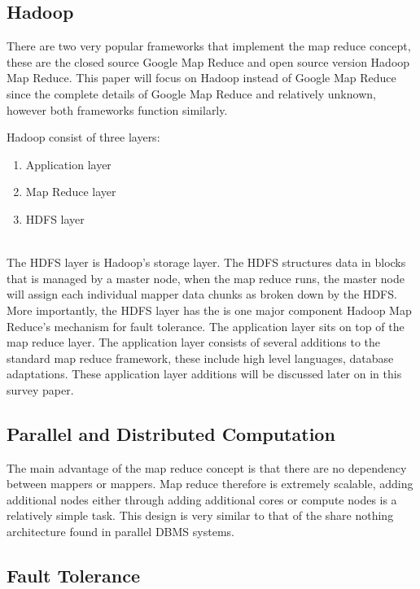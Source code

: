 \documentclass[10pt,twocolumn]{IEEEtran11}
\begin{document}
\subsection{Hadoop}
There are two very popular frameworks that implement the map reduce concept, these are the closed source Google Map Reduce and open source version Hadoop Map Reduce.  
This paper will focus on Hadoop instead of Google Map Reduce since the complete details of Google Map Reduce and relatively unknown, however both frameworks function similarly.
\par
Hadoop consist of three layers:
\  \\
\begin{enumerate}
	\setlength\itemsep{1em}
	\item Application layer
	\item Map Reduce layer
	\item HDFS layer
\end{enumerate} 
\  \\
The HDFS layer is Hadoop's storage layer.  The HDFS structures data in blocks that is managed by a master node, when the map reduce runs, the master node will assign each individual mapper data chunks as broken down by the HDFS.  More importantly, the HDFS layer has the is one major component Hadoop Map Reduce's mechanism for
fault tolerance.  The application layer sits on top of the map reduce layer.  The application layer consists of several additions to the standard map reduce framework, these include high level languages, database adaptations.  These application layer additions will be discussed later on in this survey paper.

\subsection{Parallel and Distributed Computation}

The main advantage of the map reduce concept is that there are no dependency between mappers or mappers.  Map reduce therefore is extremely scalable, adding additional nodes either through adding additional cores or compute nodes is a relatively simple task.  This design is very similar to that of the share nothing architecture found in parallel DBMS systems.

\subsection{Fault Tolerance}
\end{document}
